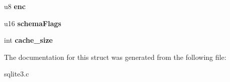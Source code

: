 \begin{DoxyCompactItemize}
\item 
u8 {\bfseries enc}\hypertarget{structSchema_a1338d09fe9cbb5a8162929202cb73cae}{}\label{structSchema_a1338d09fe9cbb5a8162929202cb73cae}

\item 
u16 {\bfseries schema\+Flags}\hypertarget{structSchema_a19310cba7982138909683b1801258c18}{}\label{structSchema_a19310cba7982138909683b1801258c18}

\item 
int {\bfseries cache\+\_\+size}\hypertarget{structSchema_a0a66691be95a30c099ca4840da7110dd}{}\label{structSchema_a0a66691be95a30c099ca4840da7110dd}

\end{DoxyCompactItemize}


The documentation for this struct was generated from the following file\+:\begin{DoxyCompactItemize}
\item 
sqlite3.\+c\end{DoxyCompactItemize}
